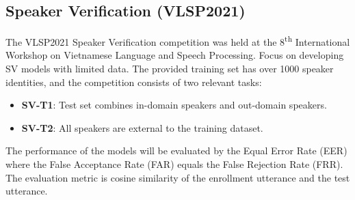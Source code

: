 \subsection{Speaker Verification (VLSP2021)} \label{s52}
The VLSP2021 Speaker Verification competition was held at the 8\textsuperscript{th} International Workshop on Vietnamese Language and Speech Processing. Focus on developing SV models with limited data. The provided training set has over 1000 speaker identities, and the competition consists of two relevant tasks:
\begin{itemize}
    \item \textbf{SV-T1}: Test set combines in-domain speakers and out-domain speakers.
    \item \textbf{SV-T2}: All speakers are external to the training dataset.
\end{itemize}

The performance of the models will be evaluated by the Equal Error Rate (EER) where the False Acceptance Rate (FAR) equals the False Rejection Rate (FRR). The evaluation metric is cosine similarity of the enrollment utterance and the test utterance.

